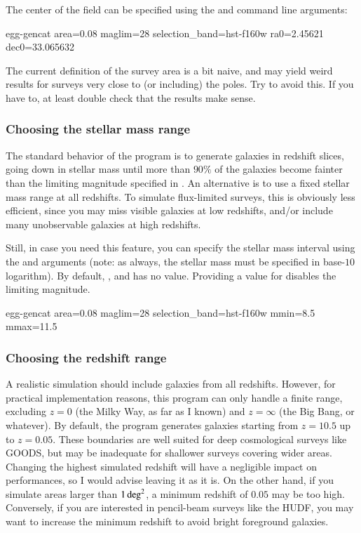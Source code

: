 \documentclass[12pt,a4paper]{article}
\begin{document}
The center of the field can be specified using the  and  command line arguments:
\begin{bashcode}
egg-gencat area=0.08 maglim=28 selection_band=hst-f160w ra0=2.45621 dec0=33.065632
\end{bashcode}
The current definition of the survey area is a bit naive, and may yield weird results for surveys very close to (or including) the poles. Try to avoid this. If you have to, at least double check that the results make sense.


\subsubsection{Choosing the stellar mass range}

The standard behavior of the program is to generate galaxies in redshift slices, going down in stellar mass until more than $90\%$ of the galaxies become fainter than the limiting magnitude specified in . An alternative is to use a fixed stellar mass range at all redshifts. To simulate flux-limited surveys, this is obviously less efficient, since you may miss visible galaxies at low redshifts, and/or include many unobservable galaxies at high redshifts.

Still, in case you need this feature, you can specify the stellar mass interval using the  and  arguments (note: as always, the stellar mass must be specified in base-$10$ logarithm). By default, , and  has no value. Providing a value for  disables the limiting magnitude.
\begin{bashcode}
egg-gencat area=0.08 maglim=28 selection_band=hst-f160w mmin=8.5 mmax=11.5
\end{bashcode}


\subsubsection{Choosing the redshift range}

A realistic simulation should include galaxies from all redshifts. However, for practical implementation reasons, this program can only handle a finite range, excluding $z=0$ (the Milky Way, as far as I known) and $z=\infty$ (the Big Bang, or whatever). By default, the program generates galaxies starting from $z=10.5$ up to $z=0.05$. These boundaries are well suited for deep cosmological surveys like GOODS, but may be inadequate for shallower surveys covering wider areas. Changing the highest simulated redshift will have a negligible impact on performances, so I would advise leaving it as it is. On the other hand, if you simulate areas larger than $1\,{\rm deg}^2$, a minimum redshift of $0.05$ may be too high. Conversely, if you are interested in pencil-beam surveys like the HUDF, you may want to increase the minimum redshift to avoid bright foreground galaxies.
\end{document}
